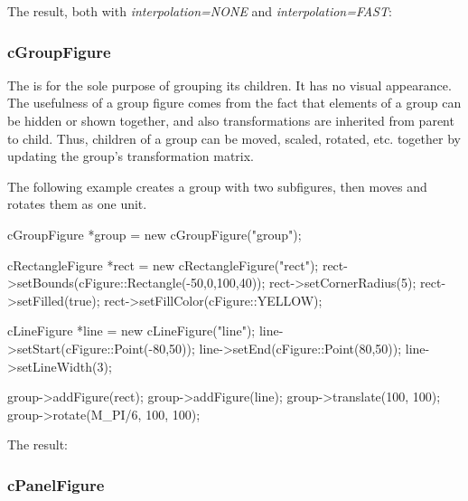 
The result, both with \textit{interpolation=NONE} and \textit{interpolation=FAST}:

\begin{center}
\end{center}


\subsubsection{cGroupFigure}
\label{sec:graphics:groupfigure}

The  is for the sole purpose of grouping its children. It
has no visual appearance. The usefulness of a group figure comes from the
fact that elements of a group can be hidden or shown together, and also
transformations are inherited from parent to child. Thus, children of a
group can be moved, scaled, rotated, etc. together by updating the group's
transformation matrix.

The following example creates a group with two subfigures, then moves and
rotates them as one unit.

\begin{cpp}
cGroupFigure *group = new cGroupFigure("group");

cRectangleFigure *rect = new cRectangleFigure("rect");
rect->setBounds(cFigure::Rectangle(-50,0,100,40));
rect->setCornerRadius(5);
rect->setFilled(true);
rect->setFillColor(cFigure::YELLOW);

cLineFigure *line = new cLineFigure("line");
line->setStart(cFigure::Point(-80,50));
line->setEnd(cFigure::Point(80,50));
line->setLineWidth(3);

group->addFigure(rect);
group->addFigure(line);
group->translate(100, 100);
group->rotate(M_PI/6, 100, 100);
\end{cpp}


The result:

\begin{center}

\end{center}


\subsubsection{cPanelFigure}
\label{sec:graphics:panelfigure}

